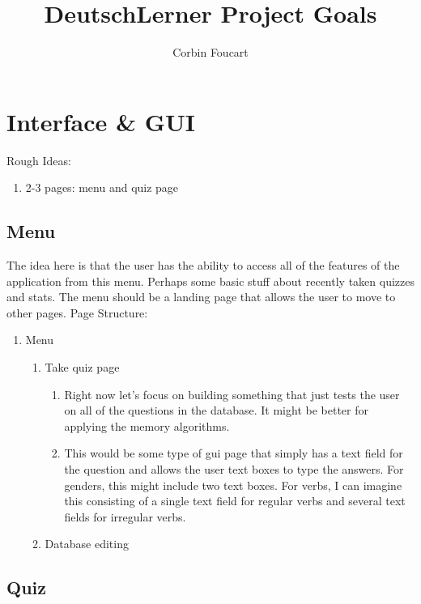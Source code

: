 \documentclass[11pt]{article}
\title{DeutschLerner Project Goals}
\author{Corbin Foucart}
\date{}
\begin{document}
\maketitle

\section{Interface \& GUI}
Rough Ideas:

\begin{enumerate}
\item 2-3 pages: menu and quiz page
\end{enumerate}

\subsection{Menu}
The idea here is that the user has the ability to access all of the features of the application from this menu.
Perhaps some basic stuff about recently taken quizzes and stats. The menu should be a landing page that
allows the user to move to other pages. Page Structure: \\

\begin{enumerate}
\item Menu
  \begin{enumerate}
    \item Take quiz page
      \begin{enumerate}
      \item Right now let's focus on building something that just tests the user on all of the questions in
        the database. It might be better for applying the memory algorithms.
      \item This would be some type of gui page that simply has a text field for the question and allows 
        the user text boxes to type the answers. For genders, this might include two text boxes. For verbs,
        I can imagine this consisting of a single text field for regular verbs and several text fields for 
        irregular verbs.
      \end{enumerate}
    \item Database editing
  \end{enumerate}
\end{enumerate}

\subsection{Quiz}
\end{document}
